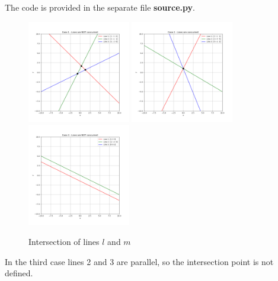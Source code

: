 The code is provided in the separate file \textbf{source.py}.

\begin{figure}[H]
    \centering
    \includegraphics[width=0.4\textwidth]{../Assets/Case_1.png}
    \includegraphics[width=0.4\textwidth]{../Assets/Case_2.png}
    \includegraphics[width=0.4\textwidth]{../Assets/Case_3.png}
    \caption{Intersection of lines \( l \) and \( m \)}
    \label{fig:intersection}
\end{figure}

In the third case lines 2 and 3 are parallel, so the intersection point is not defined.